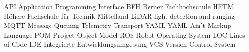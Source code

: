    {API}   {Application Programming Interface}
   {BFH}   {Berner Fachhochschule}
  {HFTM}  {Höhere Fachschule für Technik Mittelland}
 {LiDAR} {light detection and ranging}
  {MQTT}  {Message Queuing Telemetry Transport}
  {YAML}  {YAML Ain’t Markup Language}
   {POM}   {Project Object Model}
   {ROS}   {Robot Operating System}
   {LOC}   {Lines of Code}
   {IDE}   {Integrierte Entwicklungsumgebung}
   {VCS}   {Version Control System}
